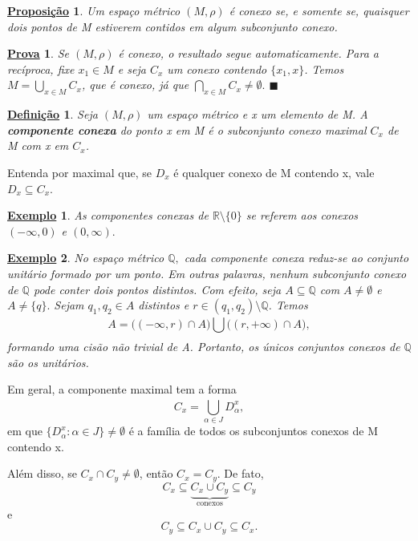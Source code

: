 \documentclass{article}
\newtheorem*{def*}{\underline{Defini\c c\~ao}}
\newtheorem*{prop*}{\underline{Proposi\c c\~ao}}
\newtheorem{example}{\underline{Exemplo}}
\newtheorem*{proof*}{\underline{Prova}}
\renewcommand\qedsymbol{$\blacksquare$}
\begin{document}
  \begin{prop*}
    Um espaço métrico \((M, \rho )\) é conexo se, e somente se, quaisquer dois pontos de M estiverem contidos em algum subconjunto
conexo.
  \end{prop*}
  \begin{proof*}
    Se \((M, \rho )\) é conexo, o resultado segue automaticamente. Para a recíproca, fixe \(x_{1}\in M\) e seja
\(C_{x}\) um conexo contendo \(\{x_{1}, x\}\). Temos \(M = \bigcup_{x\in M}^{}{C_{x}}\), que é conexo, já que \(\bigcap_{x\in M}^{}{C_{x}}\neq\emptyset.\) \qedsymbol
  \end{proof*}
  \begin{def*}
    Seja \((M, \rho )\) um espaço métrico e x um elemento de M. A \textbf{componente conexa} do ponto x em M é o subconjunto conexo maximal
 \(C_{x}\) de M com x em \(C_{x}\). 
  \end{def*}
  Entenda por maximal que, se \(D_{x}\) é qualquer conexo de M contendo x, vale \(D_{x}\subseteq{C_{x}}.\)
 \begin{example}
   As componentes conexas de \(\mathbb{R}\setminus{\{0\}}\) se referem aos conexos \((-\infty, 0)\) e \((0, \infty).\)
 \end{example}
 \begin{example}
   No espaço métrico \(\mathbb{Q},\) cada componente conexa reduz-se ao conjunto unitário formado por um ponto. Em outras palavras,
nenhum subconjunto conexo de \(\mathbb{Q}\) pode conter dois pontos distintos. Com efeito, seja \(A\subseteq{\mathbb{Q}}\) com \(A \neq\emptyset\)
e \(A\neq\{q\}.\) Sejam \(q_{1}, q_{2}\in A\) distintos e \(r\in(q_{1}, q_{2})\setminus{\mathbb{Q}}\). Temos 
  \[
    A = \biggl((-\infty, r)\cap A\biggr)\bigcup_{}^{}{\biggl((r, +\infty)\cap A\biggr)},
  \]
  formando uma cisão não trivial de A. Portanto, os únicos conjuntos conexos de \(\mathbb{Q}\) são os unitários.
 \end{example}
  Em geral, a componente maximal tem a forma 
    \[
      C_{x} = \bigcup_{\alpha \in J}^{}{D_{\alpha }^{x}},
    \]
  em que \(\{D_{\alpha }^{x}: \alpha \in J\}\neq\emptyset\) é a família de todos os subconjuntos conexos de M contendo x.

  Além disso, se \(C_{x}\cap C_{y} \neq\emptyset\), então \(C_{x} = C_{y}.\) De fato, 
    \[
      C_{x} \subseteq\underbrace{{C_{x}\cup C_{y}}}_{\text{conexos}} \subseteq{C_{y}}
    \]
  e 
    \[
      C_{y}\subseteq{C_{x}\cup C_{y}}\subseteq{C_{x}}.
    \]
\end{document}
